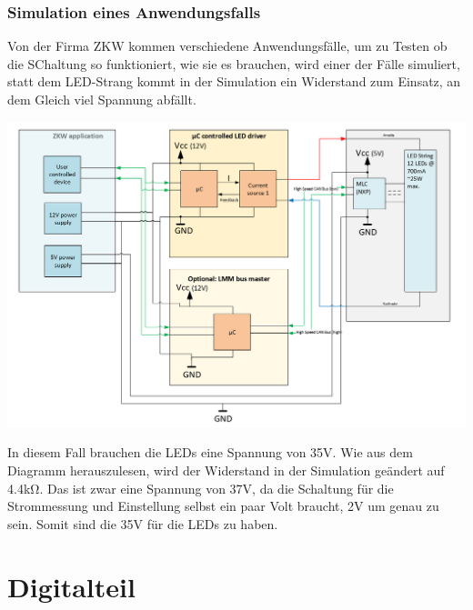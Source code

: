 \documentclass[paper=a4, 12pt]{scrreprt}
\begin{document}
			\subsubsection{Simulation eines Anwendungsfalls}
			Von der Firma ZKW kommen verschiedene Anwendungsfälle, um zu Testen ob die SChaltung so funktioniert, wie sie es brauchen, wird einer der Fälle simuliert, statt dem LED-Strang kommt in der Simulation ein Widerstand zum Einsatz, an dem Gleich viel Spannung abfällt.
			\begin{adjustbox}{center,caption={Anwendungsfall von ZKW},label={fig:anwendungsfall},nofloat=figure,vspace=\bigskipamount}
				\includegraphics[width=\textwidth]{img/SimulierterAnwendungsfall.PNG}
			\end{adjustbox}
			In diesem Fall brauchen die LEDs eine Spannung von 35V. Wie aus dem Diagramm herauszulesen, wird der Widerstand in der Simulation geändert auf 4.4kΩ. Das ist zwar eine Spannung von 37V, da die Schaltung für die Strommessung und Einstellung selbst ein paar Volt braucht, 2V um genau zu sein. Somit sind die 35V für die LEDs zu haben. 
			\pagebreak
			
			
	\section{Digitalteil}
\end{document}
